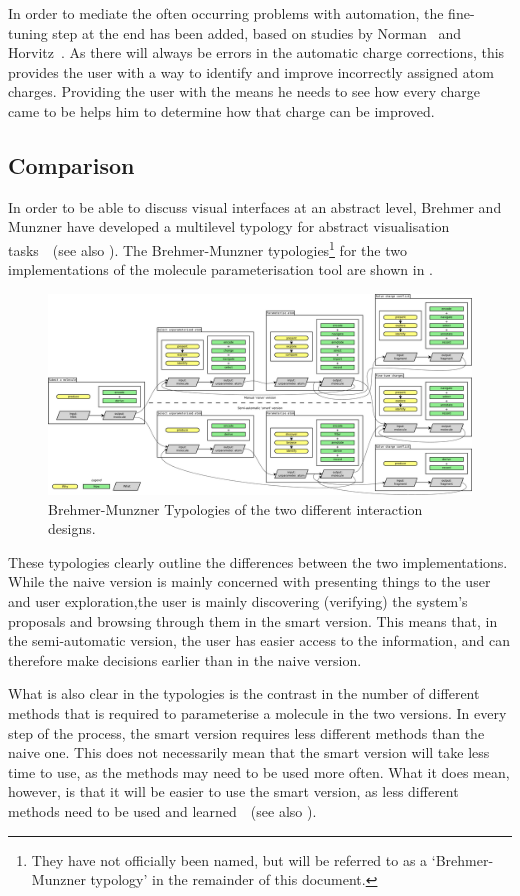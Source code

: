 In order to mediate the often occurring problems with automation, the fine-tuning step at the end has been added, based on studies by Norman~\cite{norman1990problem} and Horvitz~\cite{horvitz1999principles}. As there will always be errors in the automatic charge corrections, this provides the user with a way to identify and improve incorrectly assigned atom charges. Providing the user with the means he needs to see how every charge came to be helps him to determine how that charge can be improved.


\subsection{Comparison}
In order to be able to discuss visual interfaces at an abstract level, Brehmer and Munzner have developed a multilevel typology for abstract visualisation tasks~\cite{brehmer2013multi}~(see also ). The Brehmer-Munzner typologies\footnote{They have not officially been named, but will be referred to as a `Brehmer-Munzner typology' in the remainder of this document.} for the two implementations of the molecule parameterisation tool are shown in .

\begin{figure}
\begin{center}
\includegraphics[width=\textwidth]{img/complete_typology.pdf}
\caption{Brehmer-Munzner Typologies of the two different interaction designs.}
\end{center}
\end{figure}

These typologies clearly outline the differences between the two implementations. While the naive version is mainly concerned with presenting things to the user and user exploration,the user is mainly discovering (verifying) the system's proposals and browsing through them in the smart version. This means that, in the semi-automatic version, the user has easier access to the information, and can therefore make decisions earlier than in the naive version.

What is also clear in the typologies is the contrast in the number of different methods that is required to parameterise a molecule in the two versions. In every step of the process, the smart version requires less different methods than the naive one. This does not necessarily mean that the smart version will take less time to use, as the methods may need to be used more often. What it does mean, however, is that it will be easier to use the smart version, as less different methods need to be used and learned~\cite{sweller1994cognitive}~(see also ).
